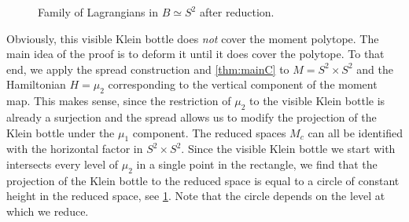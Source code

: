 \documentclass[10pt,oneside,reqno]{amsart}
\theoremstyle{definition}
\begin{document}
\begin{figure}[h]
    \caption{Family of Lagrangians in $B \simeq S^2$ after reduction.}
    \label{fig:Lagrangians}
\end{figure}

Obviously, this visible Klein bottle does \emph{not} cover the moment polytope. The main idea of the proof is to deform it until it does cover the polytope. To that end, we apply the spread construction and \cref{thm:mainC} to $M=S^2 \times S^2$ and the Hamiltonian $H = \mu_2$ corresponding to the vertical component of the moment map. This makes sense, since the restriction of $\mu_2$ to the visible Klein bottle is already a surjection and the spread allows us to modify the projection of the Klein bottle under the $\mu_1$ component. The reduced spaces $M_c$ can all be identified with the horizontal factor in $S^2 \times S^2$. Since the visible Klein bottle we start with intersects every level of $\mu_2$ in a single point in the rectangle, we find that the projection of the Klein bottle to the reduced space is equal to a circle of constant height in the reduced space, see \cref{fig:Lagrangians}. Note that the circle depends on the level at which we reduce.
\end{document}
